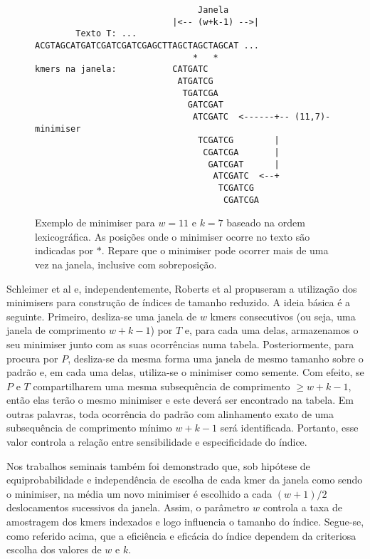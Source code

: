 \documentclass[12pt, a4paper, oneside]{article}
\begin{document}
\begin{figure}[htpb]
	\centering

	\begin{verbatim}
                                Janela
                           |<-- (w+k-1) -->|  
        Texto T: ... ACGTAGCATGATCGATCGATCGAGCTTAGCTAGCTAGCAT ...
                               *   *	
kmers na janela:           CATGATC
                            ATGATCG
                             TGATCGA
                              GATCGAT
                               ATCGATC  <------+-- (11,7)-minimiser 
                                TCGATCG        |
                                 CGATCGA       |
                                  GATCGAT      |
                                   ATCGATC  <--+
                                    TCGATCG
                                     CGATCGA
	\end{verbatim}
	\caption{Exemplo de minimiser para $w=11$ e $k=7$ baseado na ordem lexicográfica. As posições onde o minimiser ocorre no texto são indicadas por $*$. Repare que o minimiser pode ocorrer mais de uma vez na janela, inclusive com sobreposição.}
	\label{fig:minimiser}
\end{figure}

Schleimer et al \cite{Schleimer2003} e, independentemente, Roberts et al \cite{Roberts2004} propuseram a utilização dos minimisers para construção de índices de tamanho reduzido. A ideia básica é a seguinte. Primeiro, desliza-se uma janela de $w$ kmers consecutivos (ou seja, uma janela de comprimento $w+k-1$) por $T$ e, para cada uma delas, armazenamos o seu minimiser junto com as suas ocorrências numa tabela. Posteriormente, para procura por $P$, desliza-se da mesma forma uma janela de mesmo tamanho sobre o padrão e, em cada uma delas, utiliza-se o minimiser como semente. Com efeito, se $P$ e $T$ compartilharem uma mesma subsequência de comprimento $\geq w+k-1$, então elas terão o mesmo minimiser e este deverá ser encontrado na tabela. Em outras palavras, toda ocorrência do padrão com alinhamento exato de uma subsequência de comprimento mínimo $w+k-1$ será identificada. Portanto, esse valor controla a relação entre sensibilidade e especificidade do índice.

Nos trabalhos seminais \cite{Schleimer2003, Roberts2004} também foi demonstrado que, sob hipótese de equiprobabilidade e independência de escolha de cada kmer da janela como sendo o minimiser, na média um novo minimiser é escolhido a cada $(w+1)/2$ deslocamentos sucessivos da janela. Assim, o parâmetro $w$ controla a taxa de amostragem dos kmers indexados e logo influencia o tamanho do índice. Segue-se, como referido acima, que a eficiência e eficácia do índice dependem da criteriosa escolha dos valores de $w$ e $k$.
\end{document}

